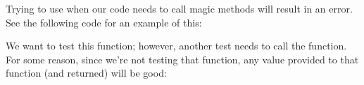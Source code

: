 \documentclass[a4paper,10pt,english]{sphinxmanual}
\begin{document}
Trying to use  when our code needs to call magic methods will result in an error. See
the following code for an example of this:

\begin{sphinxVerbatim}[commandchars=\\\{\}]
 

       \PYG{p}{[}\PYG{p}{]}
          \PYG{p}{[}\PYG{p}{]}     

      
         \PYG{p}{[}\PYG{p}{]}

     
         

  
     \PYG{p}{[}\PYG{p}{]}\PYG{p}{[}\PYG{p}{]}
\end{sphinxVerbatim}

We want to test this function; however, another test needs to call
the  function. For some reason, since we’re not testing that function, any
value provided to that function (and returned) will be good:
\end{document}
